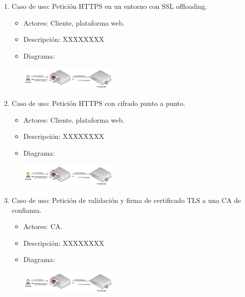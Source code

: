 \begin{enumerate}
  \item Caso de uso: Petición HTTPS en un entorno con SSL offloading.
    \begin{itemize}
      \item Actores: Cliente, plataforma web.
      \item Descripción: XXXXXXXX
      \item Diagrama:
        \begin{center}
          \label{fig:CasoUsoXX}
          \includegraphics[width=0.4\textwidth]{fig/UseCase1}
        \end{center}
    \end{itemize}
  \item Caso de uso: Petición HTTPS con cifrado punto a punto.
    \begin{itemize}
      \item Actores: Cliente, plataforma web.
      \item Descripción: XXXXXXXX
      \item Diagrama:
        \begin{center}
          \label{fig:CasoUsoXXX}
          \includegraphics[width=0.4\textwidth]{fig/UseCase1}
        \end{center}
    \end{itemize}
  \item Caso de uso: Petición de validación y firma de certificado TLS a una CA de confianza.
    \begin{itemize}
      \item Actores: \acrlong{CA}.
      \item Descripción: XXXXXXXX
      \item Diagrama:
        \begin{center}
          \label{fig:CasoUsoXXXXX}
          \includegraphics[width=0.4\textwidth]{fig/UseCase1}
        \end{center}
    \end{itemize}
\end{enumerate}


